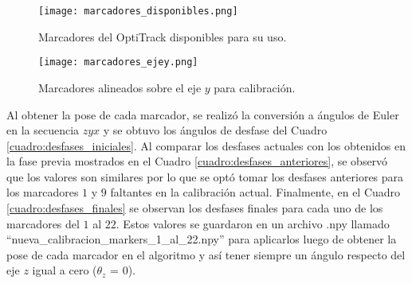 \begin{figure}[H]
	\centering
	\texttt{[image: marcadores\_disponibles.png]}
	\caption{Marcadores del OptiTrack disponibles para su uso.}
	\label{fig:marcadores_disponibles}
\end{figure}

\begin{figure}[H]
	\centering
	\texttt{[image: marcadores\_ejey.png]}
	\caption{Marcadores alineados sobre el eje $y$ para calibración.}
	\label{fig:marcadores_calibracion}
\end{figure}

Al obtener la pose de cada marcador, se realizó la conversión a ángulos de Euler en la secuencia $zyx$ y se obtuvo los ángulos de desfase del Cuadro \ref{cuadro:desfases_iniciales}. Al comparar los desfases actuales con los obtenidos en la fase previa mostrados en el Cuadro \ref{cuadro:desfases_anteriores}, se observó que los valores son similares por lo que se optó tomar los desfases anteriores para los marcadores $1$ y $9$ faltantes en la calibración actual. Finalmente, en el Cuadro \ref{cuadro:desfases_finales} se observan los desfases finales para cada uno de los marcadores del $1$ al $22$. Estos valores se guardaron en un archivo .npy llamado ``nueva\_calibracion\_markers\_1\_al\_22.npy'' para aplicarlos luego de obtener la pose de cada marcador en el algoritmo y así tener siempre un ángulo respecto del eje $z$ igual a cero ($\theta_z$ = 0).

